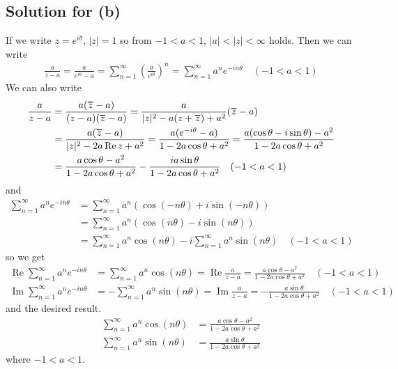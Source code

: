\documentclass{scrartcl}
\newcommand\Overline[2][0.8pt]{%
  \begin{tikzpicture}[baseline=(a.base)]
    \node[inner xsep=0pt,inner ysep=1.5pt] (a) {$#2$};
    \draw[line width= #1] (a.north west) -- (a.north east);
  \end{tikzpicture}
}
\newcommand{\imag}{\operatorname{Im}}
\newcommand{\real}{\operatorname{Re}}
\begin{document}
\subsection{Solution for (b)}
If we write \(z = e^{i\theta}\), \(|z| = 1\) so from \(-1 < a < 1\), \(|a| < |z| < \infty\) holds.
Then we can write
\begin{align*}
  \frac{a}{z - a}
  = \frac{a}{e^{i\theta} - a}
  = \sum^\infty_{n = 1} \left( \frac{a}{e^{i\theta}} \right)^n
  = \sum^\infty_{n = 1} a^n e^{-in\theta} \quad (-1 < a < 1)
\end{align*}
We can also write
\begin{align*}
  \frac{a}{z - a}
  &= \frac{a(\Overline{z} - a)}{(z - a)(\Overline{z} - a)}
  = \frac{a}{|z|^2 -a(z + \Overline{z}) + a^2}(\Overline{z} - a) \\
  &= \frac{a(\Overline{z} - a)}{|z|^2 - 2a \real z + a^2}
  = \frac{a(e^{-i\theta} - a)}{1 - 2a \cos\theta + a^2}
  = \frac{a(\cos \theta - i\sin \theta) - a^2}{1 - 2a \cos\theta + a^2} \\
  &= \frac{a \cos\theta - a^2}{1 - 2a \cos\theta + a^2} - \frac{ia \sin\theta}{1 - 2a \cos\theta + a^2} \quad (-1 < a < 1)
\end{align*}
and
\begin{align*}
  \sum^\infty_{n = 1} a^n e^{-in\theta}
  &= \sum^\infty_{n = 1} a^n (\cos (-n\theta) + i\sin (-n\theta)) \\
  &= \sum^\infty_{n = 1} a^n (\cos (n\theta) - i\sin (n\theta)) \\
  &= \sum^\infty_{n = 1} a^n \cos (n\theta) - i\sum^\infty_{n = 1} a^n \sin (n\theta) \quad (-1 < a < 1)
\end{align*}
so we get
\begin{align*}
  \real \sum^\infty_{n = 1} a^n e^{-in\theta}
  &= \sum^\infty_{n = 1} a^n \cos (n\theta)
  = \real \frac{a}{z - a}
  = \frac{a \cos\theta - a^2}{1 - 2a \cos\theta + a^2} \quad (-1 < a < 1) \\
  \imag \sum^\infty_{n = 1} a^n e^{-in\theta}
  &= -\sum^\infty_{n = 1} a^n \sin (n\theta)
  = \imag \frac{a}{z - a}
  = -\frac{a \sin\theta}{1 - 2a \cos\theta + a^2} \quad (-1 < a < 1)
\end{align*}
and the desired result.
\begin{align*}
  \sum^\infty_{n = 1} a^n \cos (n\theta)
  &= \frac{a \cos\theta - a^2}{1 - 2a \cos\theta + a^2} \\
  \sum^\infty_{n = 1} a^n \sin (n\theta)
  &= \frac{a \sin\theta}{1 - 2a \cos\theta + a^2}
\end{align*}
where \(-1 < a < 1\).
\end{document}
